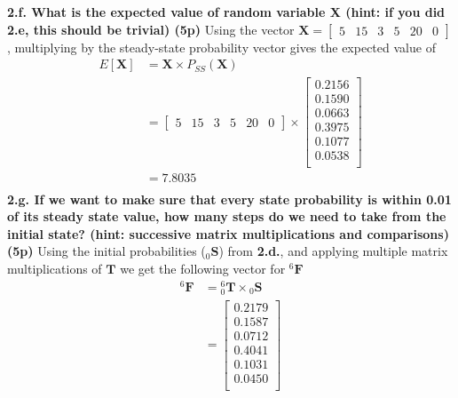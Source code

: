 \documentclass[a4paper,10pt]{article}
\newcommand{\matst}[1]{\ensuremath{{_{#1}}{\mathbf{S}}}}
\newcommand{\matfin}[1]{\ensuremath{{^{#1}}{\mathbf{F}}}}
\newcommand{\mattrans}[2]{{\ensuremath{{_{#1}^{#2}}{\mathbf{T}}}}}
\begin{document}
\newline\noindent\newline\noindent
\textbf{2.f. What is the expected value of random variable X (hint: if you did 2.e, this should be trivial) (5p)}
\newline\noindent\newline\noindent
Using the vector $\mathbf{X} = \left[\begin{array}{cccccc}5 & 15 & 3 & 5 & 20 & 0\end{array}\right]$, multiplying by the steady-state probability vector gives the expected value of
\begin{equation*}
\begin{split}
E\left[\mathbf{X}\right] &= {\mathbf{X}}{\times}{P_{SS}\left(\mathbf{X}\right)}\\ 
&=\left[\begin{array}{cccccc}5 & 15 & 3 & 5 & 20 & 0\end{array}\right]\times
\left[\begin{array}{c}
0.2156\\
0.1590\\
0.0663\\
0.3975\\
0.1077\\
0.0538\\
\end{array}\right]\\
&=\boxed{7.8035}\\
\end{split} 
\end{equation*}
\newline\noindent\newline\noindent
\textbf{2.g. If we want to make sure that every state probability is within 0.01 of its steady state value, how many steps do we need to take from the initial state? (hint: successive matrix multiplications and comparisons) (5p)}
\newline\noindent\newline\noindent
Using the initial probabilities ($\matst{0}$) from \textbf{2.d.}, and applying multiple matrix multiplications of $\mathbf{T}$ we get the following vector for $\matfin{6}$
\begin{equation*}
\begin{split}
\matfin{6}&={\mattrans{0}{6}}{\times}{\matst{0}}\\
&=
\left[
\begin{array}{c}
0.2179\\
0.1587\\
0.0712\\
0.4041\\
0.1031\\
0.0450\\
\end{array}
\right]\\
\end{split} 
\end{equation*}
\end{document}
